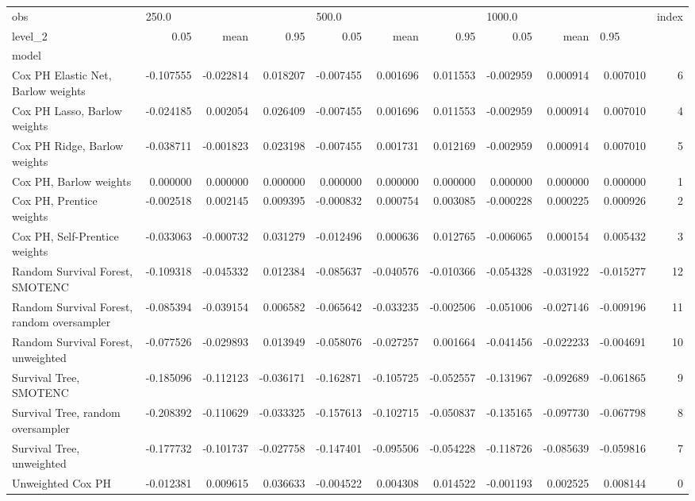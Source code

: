 \begin{tabular}{lrrrrrrrrrr}
\toprule
obs & \multicolumn{3}{l}{250.0} & \multicolumn{3}{l}{500.0} & \multicolumn{3}{l}{1000.0} & index \\
level\_2 &      0.05 &      mean &      0.95 &      0.05 &      mean &      0.95 &      0.05 &      mean & \multicolumn{2}{l}{0.95} \\
model                                      &           &           &           &           &           &           &           &           &           &       \\
\midrule
Cox PH Elastic Net, Barlow weights         & -0.107555 & -0.022814 &  0.018207 & -0.007455 &  0.001696 &  0.011553 & -0.002959 &  0.000914 &  0.007010 &     6 \\
Cox PH Lasso, Barlow weights               & -0.024185 &  0.002054 &  0.026409 & -0.007455 &  0.001696 &  0.011553 & -0.002959 &  0.000914 &  0.007010 &     4 \\
Cox PH Ridge, Barlow weights               & -0.038711 & -0.001823 &  0.023198 & -0.007455 &  0.001731 &  0.012169 & -0.002959 &  0.000914 &  0.007010 &     5 \\
Cox PH, Barlow weights                     &  0.000000 &  0.000000 &  0.000000 &  0.000000 &  0.000000 &  0.000000 &  0.000000 &  0.000000 &  0.000000 &     1 \\
Cox PH, Prentice weights                   & -0.002518 &  0.002145 &  0.009395 & -0.000832 &  0.000754 &  0.003085 & -0.000228 &  0.000225 &  0.000926 &     2 \\
Cox PH, Self-Prentice weights              & -0.033063 & -0.000732 &  0.031279 & -0.012496 &  0.000636 &  0.012765 & -0.006065 &  0.000154 &  0.005432 &     3 \\
Random Survival Forest, SMOTENC            & -0.109318 & -0.045332 &  0.012384 & -0.085637 & -0.040576 & -0.010366 & -0.054328 & -0.031922 & -0.015277 &    12 \\
Random Survival Forest, random oversampler & -0.085394 & -0.039154 &  0.006582 & -0.065642 & -0.033235 & -0.002506 & -0.051006 & -0.027146 & -0.009196 &    11 \\
Random Survival Forest, unweighted         & -0.077526 & -0.029893 &  0.013949 & -0.058076 & -0.027257 &  0.001664 & -0.041456 & -0.022233 & -0.004691 &    10 \\
Survival Tree, SMOTENC                     & -0.185096 & -0.112123 & -0.036171 & -0.162871 & -0.105725 & -0.052557 & -0.131967 & -0.092689 & -0.061865 &     9 \\
Survival Tree, random oversampler          & -0.208392 & -0.110629 & -0.033325 & -0.157613 & -0.102715 & -0.050837 & -0.135165 & -0.097730 & -0.067798 &     8 \\
Survival Tree, unweighted                  & -0.177732 & -0.101737 & -0.027758 & -0.147401 & -0.095506 & -0.054228 & -0.118726 & -0.085639 & -0.059816 &     7 \\
Unweighted Cox PH                          & -0.012381 &  0.009615 &  0.036633 & -0.004522 &  0.004308 &  0.014522 & -0.001193 &  0.002525 &  0.008144 &     0 \\
\bottomrule
\end{tabular}
